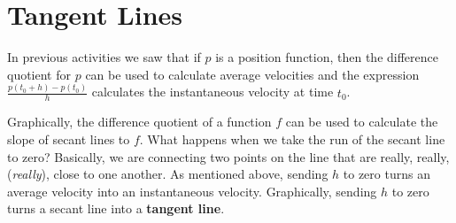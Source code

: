 \documentclass[10pt,oneside,]{book}
\newcommand{\terminology}[1]{\textbf{#1}}
\theoremstyle{plain}
\theoremstyle{definition}
\numberwithin{equation}{section}
\newcommand{\fe}[2]{#1\mathopen{}\left(#2\right)\mathclose{}}
\begin{document}
\section[Tangent Lines]{Tangent Lines}\label{section-tangent-lines}
In previous activities we saw that if \(p\) is a position function, then the difference quotient for \(p\) can be used to calculate average velocities and the expression \(\frac{\fe{p}{t_0+h}-\fe{p}{t_0}}{h}\) calculates the instantaneous velocity at time \(t_0\).%
\par
Graphically, the difference quotient of a function \(f\) can be used to calculate the slope of secant lines to \(f\). What happens when we take the run of the secant line to zero? Basically, we are connecting two points on the line that are really, really, (\emph{really}), close to one another. As mentioned above, sending \(h\) to zero turns an average velocity into an instantaneous velocity. Graphically, sending \(h\) to zero turns a secant line into a \terminology{tangent line}.%
\end{document}
